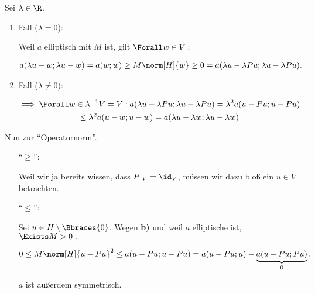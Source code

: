 \begin{solution}
\begin{enumerate}[label = \textbf{\alph*)}]
\begin{itemize}
    Sei $\lambda \in \R$.

    \begin{enumerate}[label = \arabic*.]

      \item Fall ($\lambda = 0$):
      
      Weil $a$ elliptisch mit $M$ ist, gilt $\Forall w \in V:$

      \begin{align*}
        a(\lambda u - w; \lambda u - w)
        =
        a(w; w)
        \geq
        M \norm[H]{w}
        \geq
        0 = a(\lambda u - \lambda Pu; \lambda u - \lambda Pu).
      \end{align*}

      \item Fall ($\lambda \neq 0$):

      \begin{multline*}
        \implies
        \Forall w \in \lambda^{-1} V = V:
        a(\lambda u - \lambda Pu;\lambda u - \lambda Pu)
        =
        \lambda^2 a(u - Pu;u - Pu) \\
        \leq
        \lambda^2 a(u - w; u - w)
        =
        a(\lambda u - \lambda w; \lambda u - \lambda w)
      \end{multline*}
    
    \end{enumerate}

\end{itemize}

  Nun zur \enquote{Operatornorm}.

  \begin{itemize}

    \item
    [\enquote{$\geq$}:]

    Weil wir ja bereits wissen, dass $P|_V = \id_V$, müssen wir dazu bloß ein $u \in V$ betrachten.

    \item
    [\enquote{$\leq$}:]

    Sei $u \in H \setminus \Bbraces{0}$.
    Wegen \textbf{b)} und weil $a$ elliptische ist, $\Exists M > 0:$

    \begin{align*}
      0 \leq M \norm[H]{u - Pu}^2
      \leq
      a(u - Pu; u - Pu)
      =
      a(u - Pu; u)
      -
      \underbrace{a(u - Pu; Pu)}_0.
    \end{align*}

    $a$ ist außerdem symmetrisch.


\end{itemize}
\end{enumerate}
\end{solution}
